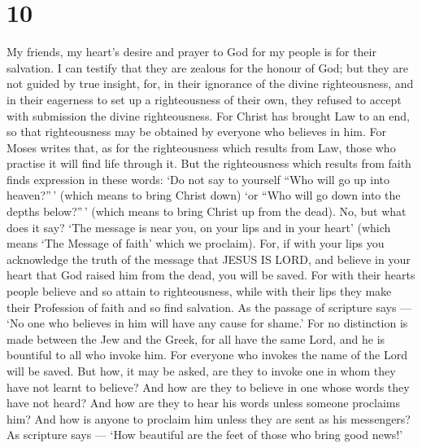 \hypertarget{section-9}{%
\section{10}\label{section-9}}

 My friends, my heart's desire and prayer to God for my
people is for their salvation.  I can testify that they are
zealous for the honour of God; but they are not guided by true insight,
 for, in their ignorance of the divine righteousness, and in
their eagerness to set up a righteousness of their own, they refused to
accept with submission the divine righteousness.  For Christ
has brought Law to an end, so that righteousness may be obtained by
everyone who believes in him.  For Moses writes that, as for
the righteousness which results from Law, those who practise it will
find life through it.  But the righteousness which results
from faith finds expression in these words: `Do not say to yourself
``Who will go up into heaven?''\,' (which means to bring Christ down)
 `or ``Who will go down into the depths below?''\,' (which
means to bring Christ up from the dead).  No, but what does
it say? `The message is near you, on your lips and in your heart' (which
means `The Message of faith' which we proclaim).  For, if
with your lips you acknowledge the truth of the message that JESUS IS
LORD, and believe in your heart that God raised him from the dead, you
will be saved.  For with their hearts people believe and so
attain to righteousness, while with their lips they make their
Profession of faith and so find salvation.  As the passage
of scripture says --- `No one who believes in him will have any cause
for shame.'  For no distinction is made between the Jew and
the Greek, for all have the same Lord, and he is bountiful to all who
invoke him.  For everyone who invokes the name of the Lord
will be saved.  But how, it may be asked, are they to
invoke one in whom they have not learnt to believe? And how are they to
believe in one whose words they have not heard? And how are they to hear
his words unless someone proclaims him?  And how is anyone
to proclaim him unless they are sent as his messengers? As scripture
says --- `How beautiful are the feet of those who bring good news!'

